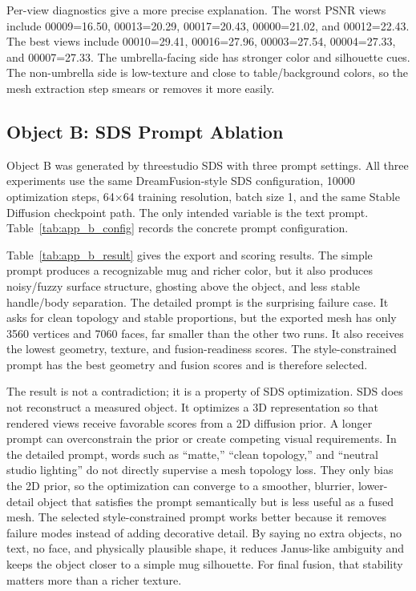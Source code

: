 \documentclass[10pt,twocolumn,letterpaper]{article}
\begin{document}
Per-view diagnostics give a more precise explanation.
The worst PSNR views include 00009=16.50, 00013=20.29, 00017=20.43, 00000=21.02, and 00012=22.43.
The best views include 00010=29.41, 00016=27.96, 00003=27.54, 00004=27.33, and 00007=27.33.
The umbrella-facing side has stronger color and silhouette cues.
The non-umbrella side is low-texture and close to table/background colors, so the mesh extraction step smears or removes it more easily.

\subsection{Object B: SDS Prompt Ablation}
Object B was generated by threestudio SDS with three prompt settings.
All three experiments use the same DreamFusion-style SDS configuration, 10000 optimization steps, 64$\times$64 training resolution, batch size 1, and the same Stable Diffusion checkpoint path.
The only intended variable is the text prompt.
Table~\ref{tab:app_b_config} records the concrete prompt configuration.

Table~\ref{tab:app_b_result} gives the export and scoring results.
The simple prompt produces a recognizable mug and richer color, but it also produces noisy/fuzzy surface structure, ghosting above the object, and less stable handle/body separation.
The detailed prompt is the surprising failure case.
It asks for clean topology and stable proportions, but the exported mesh has only 3560 vertices and 7060 faces, far smaller than the other two runs.
It also receives the lowest geometry, texture, and fusion-readiness scores.
The style-constrained prompt has the best geometry and fusion scores and is therefore selected.

The result is not a contradiction; it is a property of SDS optimization.
SDS does not reconstruct a measured object.
It optimizes a 3D representation so that rendered views receive favorable scores from a 2D diffusion prior.
A longer prompt can overconstrain the prior or create competing visual requirements.
In the detailed prompt, words such as ``matte,'' ``clean topology,'' and ``neutral studio lighting'' do not directly supervise a mesh topology loss.
They only bias the 2D prior, so the optimization can converge to a smoother, blurrier, lower-detail object that satisfies the prompt semantically but is less useful as a fused mesh.
The selected style-constrained prompt works better because it removes failure modes instead of adding decorative detail.
By saying no extra objects, no text, no face, and physically plausible shape, it reduces Janus-like ambiguity and keeps the object closer to a simple mug silhouette.
For final fusion, that stability matters more than a richer texture.
\end{document}
